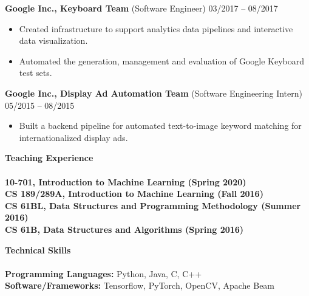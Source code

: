 \documentclass{article}
\begin{document}
\noindent
\textbf{Google Inc., Keyboard Team} (Software Engineer)
\hfill 03/2017 -- 08/2017\\
\begin{itemize}
\vspace{-6.5mm}
\item Created infrastructure to support analytics data pipelines and interactive data visualization.
\vspace{-2.5mm}
\item Automated the generation, management and evaluation of Google Keyboard test sets.
\end{itemize}
\vspace{-1mm}

\noindent
\textbf{Google Inc., Display Ad Automation Team} (Software Engineering Intern)
\hfill 05/2015 -- 08/2015\\
\begin{itemize}
\vspace{-6.5mm}
\item Built a backend pipeline for automated text-to-image keyword matching for internationalized display ads.
\end{itemize}

\vspace{3mm}
\noindent
\textbf{{\Large Teaching Experience}}\\[-2mm]
\HRule\\
\vspace{1mm}
\hspace*{0.1mm}\textbf{10-701, Introduction to Machine Learning (Spring 2020)} \\
\vspace{1mm}
\textbf{CS 189/289A, Introduction to Machine Learning (Fall 2016)} \\
\vspace{1mm}
\textbf{CS 61BL, Data Structures and Programming Methodology (Summer 2016)} \\
\vspace{1mm}
\textbf{CS 61B, Data Structures and Algorithms (Spring 2016)}
\vspace{3.0mm}

\vspace{2mm}
\noindent
\textbf{\Large Technical Skills}\\[-2mm]
\HRule\\
\textbf{Programming Languages:} Python, Java, C, C++ \\
\textbf{Software/Frameworks:} Tensorflow, PyTorch, OpenCV, Apache Beam


\end{document}
